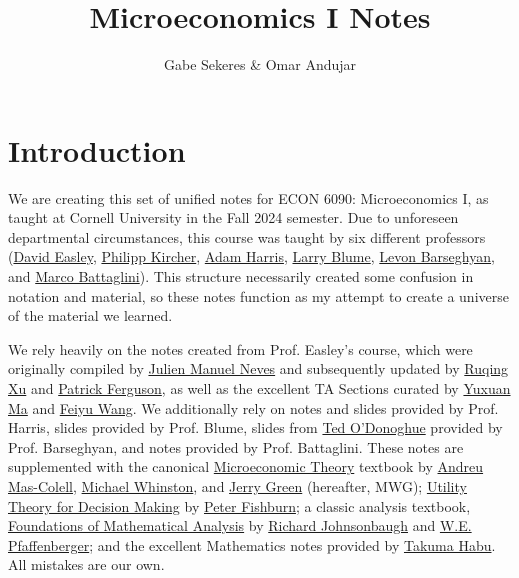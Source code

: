 \documentclass[12pt]{article}
\title{Microeconomics I Notes}
\author{Gabe Sekeres \& Omar Andujar}
\begin{document}
\maketitle

\tableofcontents

\newpage

\section*{Introduction}

We are creating this set of unified notes for ECON 6090: Microeconomics I, as taught at Cornell University in the Fall 2024 semester. Due to unforeseen departmental circumstances, this course was taught by six different professors (\href{https://easley.economics.cornell.edu/}{David Easley}, \href{https://philippkircher.com/}{Philipp Kircher}, \href{https://adamharris.phd/}{Adam Harris}, \href{https://sites.santafe.edu/~leb/}{Larry Blume}, \href{https://barseghyan.economics.cornell.edu/}{Levon Barseghyan}, and \href{https://www.mbattaglini.com/}{Marco Battaglini}). This structure necessarily created some confusion in notation and material, so these notes function as my attempt to create a universe of the material we learned.

We rely heavily on the notes created from Prof. Easley's course, which were originally compiled by \href{https://julienneves.com/}{Julien Manuel Neves} and subsequently updated by \href{https://ruqing-xu.github.io/}{Ruqing Xu} and \href{https://economics.cornell.edu/patrick-ferguson}{Patrick Ferguson}, as well as the excellent TA Sections curated by \href{https://economics.cornell.edu/yuxuan-ma}{Yuxuan Ma} and \href{https://dyson.cornell.edu/programs/graduate/graduate-student-directory/}{Feiyu Wang}. We additionally rely on notes and slides provided by Prof. Harris, slides provided by Prof. Blume, slides from \href{https://blogs.cornell.edu/odonoghue/}{Ted O'Donoghue} provided by Prof. Barseghyan, and notes provided by Prof. Battaglini. These notes are supplemented with the canonical \href{https://global.oup.com/academic/product/microeconomic-theory-9780195073409?cc=us&lang=en&}{Microeconomic Theory} textbook by \href{https://www.upf.edu/web/andreu-mas-colell}{Andreu Mas-Colell}, \href{https://mitsloan.mit.edu/faculty/directory/michael-whinston}{Michael Whinston}, and \href{https://www.hbs.edu/faculty/Pages/profile.aspx?facId=6466}{Jerry Green} (hereafter, MWG); \href{https://www.semanticscholar.org/paper/Utility-theory-for-decision-making-Fishburn/905a24a912171436e0abd3b5f1fdcb963e6f852f}{Utility Theory for Decision Making} by \href{https://en.wikipedia.org/wiki/Peter_C._Fishburn}{Peter Fishburn}; a classic analysis textbook, \href{https://store.doverpublications.com/products/9780486477664}{Foundations of Mathematical Analysis} by \href{https://condor.depaul.edu/~rjohnson/}{Richard Johnsonbaugh} and \href{https://www.mathgenealogy.org/id.php?id=12494}{W.E. Pfaffenberger}; and the excellent Mathematics notes provided by \href{https://www.takumahabu.com/Economics}{Takuma Habu}. All mistakes are our own.
\end{document}
